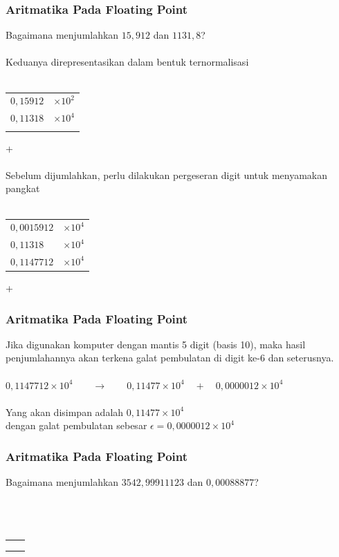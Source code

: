 \documentclass{beamer}
\begin{document}

\begin{frame}
\frametitle{Aritmatika Pada Floating Point}
Bagaimana menjumlahkan  $15,912$ dan $1131,8$?
\\\ \\Keduanya direpresentasikan dalam bentuk ternormalisasi
\\\ \\\begin{tabular}{rl}
	$0,15912$ & $\times 10^2$\\
	$0,11318$ & $\times 10^4$\\
	\hline
	& \\
\end{tabular}+
\\\ \\Sebelum dijumlahkan, perlu dilakukan pergeseran digit untuk menyamakan pangkat
\\\ \\\begin{tabular}{ll}
	$0,0015912$ & $\times 10^4$\\
	$0,11318$ & $\times 10^4$\\
	\hline
	$0,1147712$ & $\times 10^4$\\
\end{tabular}+
\end{frame}


\begin{frame}
\frametitle{Aritmatika Pada Floating Point}
Jika digunakan komputer dengan mantis 5 digit (basis 10), maka hasil penjumlahannya akan terkena galat pembulatan di digit ke-6 dan seterusnya.
\\\ \\$0,1147712\times 10^4\qquad \longrightarrow\qquad 0,11477\times 10^4 \quad+\quad 0,0000012 \times 10^4$
\\\ \\Yang akan disimpan adalah $0,11477\times 10^4$ 
\\dengan galat pembulatan sebesar $\epsilon=0,0000012 \times 10^4$
\end{frame}


\begin{frame}
\frametitle{Aritmatika Pada Floating Point}
Bagaimana menjumlahkan $3542,99911123$ dan $0,00088877$?
\\\ \\\ 
\\\ \\\begin{tabular}{rl}
	& \\
	& \\
	& \\
\end{tabular}

\end{frame}
\end{document}
